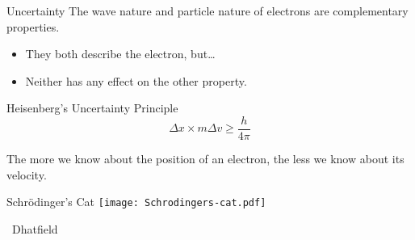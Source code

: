 \documentclass[notes=onlyslideswithnotes,notes=hide]{beamer}
\begin{document}
\clearpage


\begin{frame}{Uncertainty}
	The wave nature and particle nature of electrons are
	\alert{complementary properties}.
	\begin{itemize}
		\item They both describe the electron, but\ldots
		\item Neither has any effect on the other property.
	\end{itemize}

	\begin{block}{Heisenberg's Uncertainty Principle}
		\begin{equation*}
			\Delta x \times m \Delta v \geq \frac{h}{4\pi}
		\end{equation*}

		The more we know about the position of an electron, the less we
		know about its velocity.
	\end{block}
\end{frame}

\begin{frame}{Schrödinger's Cat}
	\centering
	\texttt{[image: Schrodingers-cat.pdf]}

	\footnotesize \ccbysa\ Dhatfield
\end{frame}


\end{document}
